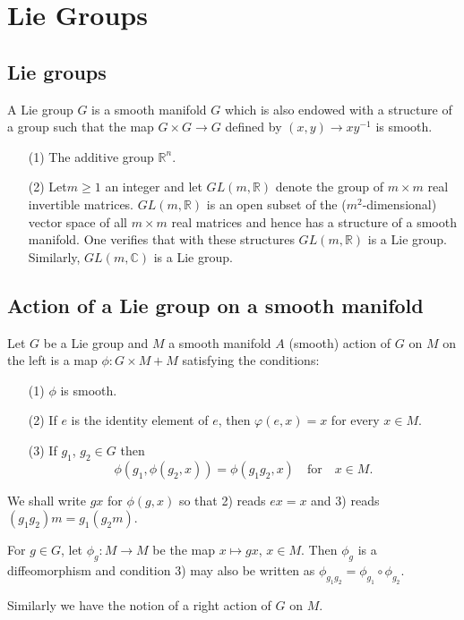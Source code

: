 \chapter{Lie Groups}\label{chap5}

\section*{Lie groups}

\begin{defi*}
A Lie group $G$ is a smooth manifold $G$ which is also endowed with a structure of a group such that the map $G\times G\to G$ defined by $(x,y)\to xy^{-1}$ is smooth.
\end{defi*}

\begin{examples*}
\begin{itemize}
\item[(1)] The additive group $\mathbb{R}^{n}$.

\item[(2)] Let\pageoriginale $m\geq 1$ an integer and let $GL(m,\mathbb{R})$ denote the group of $m\times m$ real invertible matrices. $GL(m,\mathbb{R})$ is an open subset of the ($m^{2}$-dimensional) vector space of all $m\times m$ real matrices and hence has a structure of a smooth manifold. One verifies that with these structures $GL(m,\mathbb{R})$ is a Lie group. Similarly, $GL(m,\mathbb{C})$ is a Lie group.
\end{itemize}
\end{examples*}

\section*{Action of a Lie group on a smooth manifold}

Let $G$ be a Lie group and $M$ a smooth manifold $A$ (smooth) action of $G$ on $M$ on the left is a map $\phi:G\times M+M$ satisfying the conditions:
\begin{itemize}
\item[(1)] $\phi$ is smooth.

\item[(2)] If $e$ is the identity element of $e$, then $\varphi(e,x)=x$ for every $x\in M$.

\item[(3)] If $g_{1}$, $g_{2}\in G$ then
$$
\phi(g_{1},\phi(g_{2},x))=\phi(g_{1}g_{2},x)\quad\text{for}\quad x\in M.
$$
\end{itemize}

We shall write $gx$ for $\phi(g,x)$ so that 2) reads $ex=x$ and 3) reads $(g_{1}g_{2})m=g_{1}(g_{2}m)$.

For $g\in G$, let $\phi_{g}:M\to M$ be the map $x\mapsto gx$, $x\in M$. Then $\phi_{g}$ is a diffeomorphism and condition 3) may also be written as $\phi_{g_{1}g_{2}}=\phi_{g_{1}}\circ \phi_{g_{2}}$.

Similarly we have the notion of a right action of $G$ on $M$.



